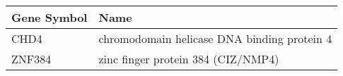 \begin{tabular}{ll}
\toprule
Gene Symbol &                                        Name \\
\midrule
       CHD4 & chromodomain helicase DNA binding protein 4 \\
     ZNF384 &          zinc finger protein 384 (CIZ/NMP4) \\
\bottomrule
\end{tabular}
